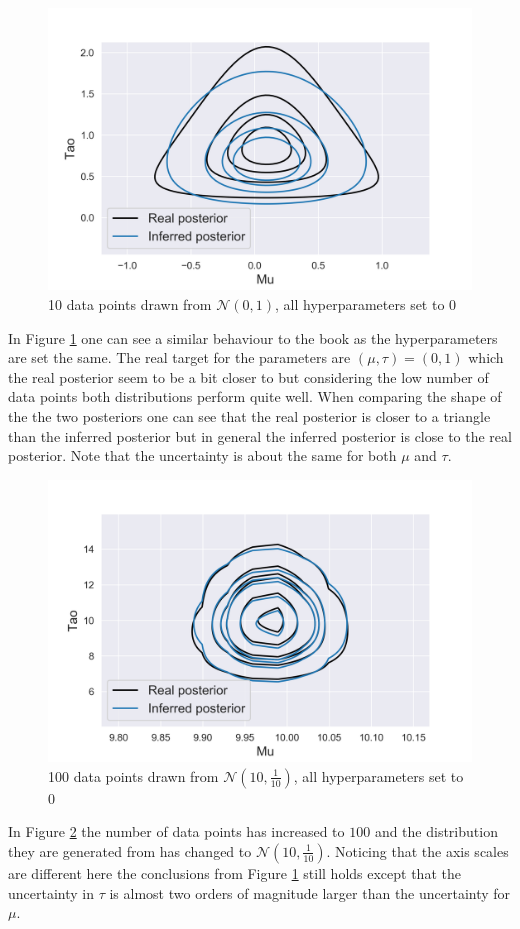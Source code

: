 \begin{figure}[H]
  \centering
  \includegraphics[width=\linewidth]{VI_plot_N_10-mu_0-tau_1.png}
  \caption{10 data points drawn from $\mathcal{N}(0,1)$, all hyperparameters set to $0$}
  \label{VI_1}
\end{figure}

In Figure \ref{VI_1} one can see a similar behaviour to the book as the hyperparameters are set the same. The real target for the parameters are $(\mu, \tau) = (0,1)$ which the real posterior seem to be a bit closer to but considering the low number of data points both distributions perform quite well. When comparing the shape of the the two posteriors one can see that the real posterior is closer to a triangle than the inferred posterior but in general the inferred posterior is close to the real posterior. Note that the uncertainty is about the same for both $\mu$ and $\tau$.

\begin{figure}[H]
  \centering
  \includegraphics[width=\linewidth]{VI_plot_N_100-mu_10-tau_10.png}
  \caption{100 data points drawn from $\mathcal{N}(10,\frac{1}{10})$, all hyperparameters set to $0$}
  \label{VI_2}
\end{figure}
In Figure \ref{VI_2} the number of data points has increased to $100$ and the distribution they are generated from has changed to $\mathcal{N}(10,\frac{1}{10})$. Noticing that the axis scales are different here the conclusions from Figure \ref{VI_1} still holds except that the uncertainty in $\tau$ is almost two orders of magnitude larger than the uncertainty for $\mu$.

